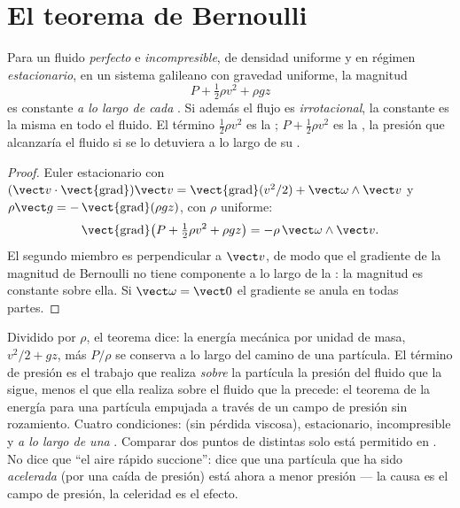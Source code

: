 \section{El teorema de Bernoulli}

\begin{theorem}[Bernoulli]\label{thm:b2:euler-bernoulli:bernoulli}
Para un fluido \emph{perfecto} e \emph{incompresible}, de densidad
uniforme y en régimen \emph{estacionario}, en un sistema galileano con gravedad uniforme, la magnitud
\[
P + \tfrac12\rho v^2 + \rho gz
\]
es constante \emph{a lo largo de cada }. Si además el
flujo es \emph{irrotacional}, la constante es la misma en todo el fluido.
El término $\tfrac12\rho v^2$ es la \emph{}; $P + \tfrac12\rho v^2$
es la \emph{}, la presión que alcanzaría el fluido
si se lo detuviera a lo largo de su .
\end{theorem}

\begin{proof}
Euler estacionario con $(\vect v\cdot\operatorname{\vect{grad}})\vect v =
\operatorname{\vect{grad}}(v^2/2) + \vect\omega\wedge\vect v$ y $\rho\vect g =
-\operatorname{\vect{grad}}(\rho gz)$, con $\rho$ uniforme:
\[
\operatorname{\vect{grad}}\bigl(P + \tfrac12\rho v^2 + \rho gz\bigr) = -\rho\,
\vect\omega\wedge\vect v .
\]
El segundo miembro es perpendicular a $\vect v$, de modo que el gradiente
de la magnitud de Bernoulli no tiene componente a lo largo de la : la magnitud es constante sobre ella. Si $\vect\omega = \vect 0$
el gradiente se anula en todas partes.
\end{proof}

\begin{remark}\label{rem:b2:euler-bernoulli:meaning}
Dividido por $\rho$, el teorema dice: la energía mecánica por unidad de
masa, $v^2/2 + gz$, más $P/\rho$ se conserva a lo largo del camino de una
partícula. El término de presión es el trabajo que realiza \emph{sobre} la
partícula la presión del fluido que la sigue, menos el que ella realiza
sobre el fluido que la precede: el teorema de la energía para una
partícula empujada a través de un campo de presión sin rozamiento. Cuatro
condiciones:  (sin pérdida viscosa), estacionario,
incompresible y \emph{a lo largo de una }. Comparar dos
puntos de  distintas solo está permitido en . No dice que ``el aire rápido succione'': dice que una
partícula que ha sido \emph{acelerada} (por una caída de presión) está
ahora a menor presión --- la causa es el campo de presión, la celeridad es el efecto.
\end{remark}

